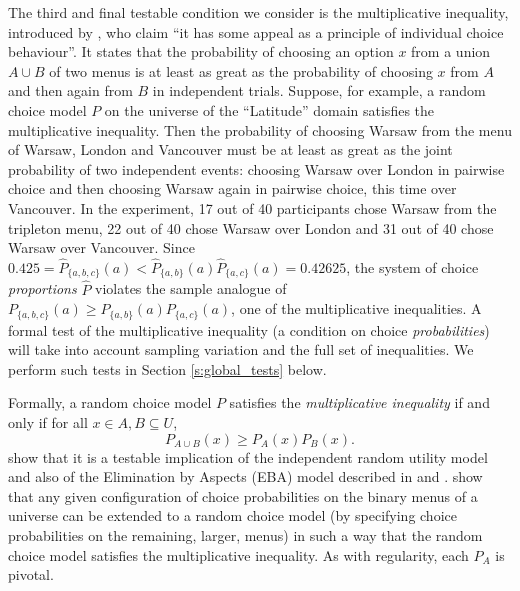 \documentclass[11pt,letter]{article}
\newcommand{\menu}{menu}
\newcommand{\menus}{menus}
\newcommand{\univ}{U}
\begin{document}
The third and final testable condition we consider is the multiplicative inequality, introduced by \citet{SattTver76}, who claim ``it has some appeal as a principle of individual choice behaviour''.
It states that the probability of choosing an option $x$ from a union $A \cup B$ of two \menus{} is at least as great as the probability of choosing $x$ from $A$ and then again from $B$ in independent trials.
Suppose, for example, a random choice model $P$ on the universe of the ``Latitude'' domain satisfies the multiplicative inequality.
Then the probability of choosing Warsaw from the \menu{} of Warsaw, London and Vancouver must be at least as great as the joint probability of two independent events: choosing Warsaw over London in pairwise choice and then choosing Warsaw again in pairwise choice, this time over Vancouver.
In the experiment, 17 out of 40 participants chose Warsaw from the tripleton menu, 22 out of 40 chose Warsaw over London and 31 out of 40 chose Warsaw over Vancouver.
Since $0.425 = \hat{P}_{\{a,b,c\}}(a) < \hat{P}_{\{a,b\}}(a) \hat{P}_{\{a,c\}}(a) = 0.42625$, the system of choice {\em proportions} $\hat P$ violates the sample analogue of $P_{\{a,b,c\}}(a) \geq P_{\{a,b\}}(a) P_{\{a,c\}}(a)$, one of the multiplicative inequalities.
A formal test of the multiplicative inequality (a condition on choice {\em probabilities}) will take into account sampling variation and the full set of inequalities.
We perform such tests in Section \ref{s:global_tests} below.

Formally, a random choice model $P$ satisfies the {\em multiplicative inequality} if and only if for all $x \in A, B \subseteq \univ$,
\begin{equation}
  P_{A \cup B}(x) \geq P_A(x) P_B(x).
\end{equation}
\citet{SattTver76} show that it is a testable implication of the independent random utility model and also of the Elimination by Aspects (EBA) model described in \citet{Tver72b} and \citet{Tver72a}.
\citet{McCaMarl24} show that any given configuration of choice probabilities on the binary \menus{} of a universe can be extended to a random choice model (by specifying choice probabilities on the remaining, larger, \menus{}) in such a way that the random choice model satisfies the multiplicative inequality.
As with regularity, each $P_A$ is pivotal.
\end{document}
